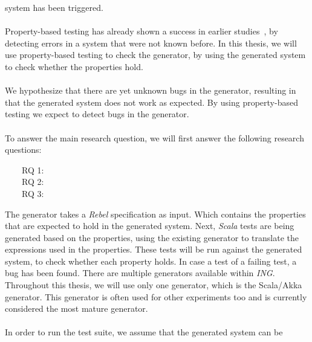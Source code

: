 system has been triggered.\\
\\
Property-based testing has already shown a success in earlier
studies~\cite{fink1997property,claessen2011quickcheck,arts2006testing}, by
detecting errors in a system that were not known before. In this thesis, we will
use property-based testing to check the generator, by using the generated system
to check whether the properties hold.\\
\\
We hypothesize that there are yet unknown bugs in the generator, resulting in
that the generated system does not work as expected. By using property-based
testing we expect to detect bugs in the generator.\\
\\
To answer the main research question, we will first answer the following
research questions:
\begin{description}
\item[~~~~RQ 1:] \rqOne
\item[~~~~RQ 2:] \rqTwo
\item[~~~~RQ 3:] \rqThree
\end{description}
The generator takes a \textit{Rebel} specification as input. Which contains the
properties that are expected to hold in the generated system. Next,
\textit{Scala} tests are being generated based on the properties, using the
existing generator to translate the expressions used in the properties. These
tests will be run against the generated system, to check whether each property
holds. In case a test of a failing test, a bug has been found. There are
multiple generators available within \textit{ING}. Throughout this thesis, we
will use only one generator, which is the Scala/Akka generator. This generator
is often used for other experiments too and is currently considered the most
mature generator.\\
\\
In order to run the test suite, we assume that the generated system can be
